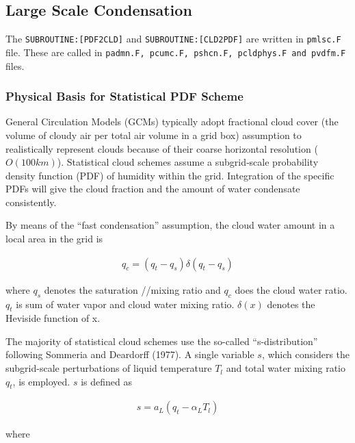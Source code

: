 \hypertarget{large-scale-condensation}{%
\subsection{Large Scale Condensation}\label{large-scale-condensation}}

The \texttt{SUBROUTINE:{[}PDF2CLD{]}} and
\texttt{SUBROUTINE:{[}CLD2PDF{]}} are written in \texttt{pmlsc.F} file.
These are called in
\texttt{padmn.F,\ pcumc.F,\ pshcn.F,\ pcldphys.F\ and\ pvdfm.F} files.

\hypertarget{physical-basis-for-statistical-pdf-scheme}{%
\subsubsection{Physical Basis for Statistical PDF
Scheme}\label{physical-basis-for-statistical-pdf-scheme}}

General Circulation Models (GCMs) typically adopt fractional cloud cover
(the volume of cloudy air per total air volume in a grid box) assumption
to realistically represent clouds because of their coarse horizontal
resolution (\(O(100km)\)). Statistical cloud schemes assume a
subgrid‐scale probability density function (PDF) of humidity within the
grid. Integration of the specific PDFs will give the cloud fraction and
the amount of water condensate consistently.

By means of the ``fast condensation'' assumption, the cloud water amount
in a local area in the grid is

\begin{eqnarray}
q_{c}=\left(q_{t}-q_{s}\right) \delta\left(q_{t}-q_{s}\right)
\label{hpc.1}
\end{eqnarray}

where \(q_s\) denotes the saturation //mixing ratio and \(q_c\) does the
cloud water ratio. \(q_t\) is sum of water vapor and cloud water mixing
ratio. \(\delta(x)\) denotes the Heviside function of x.

The majority of statistical cloud schemes use the so-called
``s-distribution'' following Sommeria and Deardorff (1977). A single
variable \(s\), which considers the subgrid-scale perturbations of
liquid temperature \(T_l\) and total water mixing ratio \(q_t\), is
employed. \(s\) is defined as

\begin{eqnarray}
s=a_{L}\left(q_{t}-\alpha_{L} T_{l}\right)
\end{eqnarray}

where

